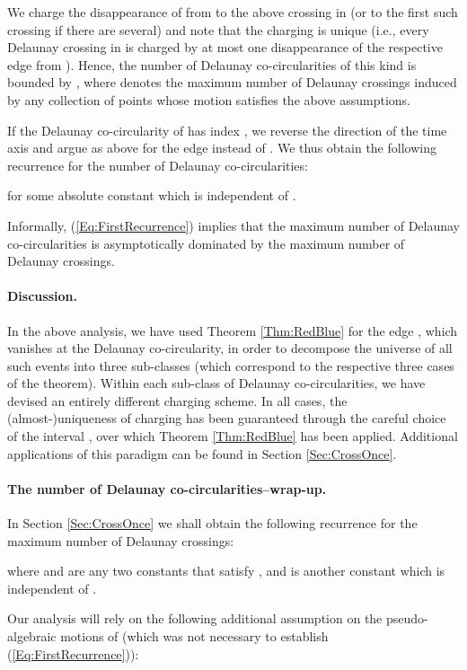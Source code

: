 \documentclass[letter,11pt]{article}
\begin{document}
We charge the disappearance of  from  to the above crossing in  (or to the first such crossing if there are several) and note that the charging is unique (i.e., every Delaunay crossing  in  is charged by at most one disappearance of the respective edge  from ).
Hence, the number of Delaunay co-circularities of this kind is bounded by , where  denotes the maximum number of Delaunay crossings induced by any collection  of  points whose motion satisfies the above assumptions.


If the Delaunay co-circularity of  has index , we reverse the direction of the time axis and argue as above for the edge  instead of . We thus obtain the following recurrence for the number of Delaunay co-circularities:


for some absolute constant  which is independent of .

Informally, (\ref{Eq:FirstRecurrence}) implies that the maximum number of Delaunay co-circularities is asymptotically dominated by the maximum number of Delaunay crossings.

\paragraph{Discussion.} In the above analysis, we have used Theorem \ref{Thm:RedBlue} for the edge , which vanishes at the Delaunay co-circularity, in order to decompose the universe of all such events into three sub-classes (which correspond to the respective three cases of the theorem). Within each sub-class of Delaunay co-circularities, we have devised an entirely different charging scheme. In all cases, the (almost-)uniqueness of charging has been guaranteed through the careful choice of the interval , over which Theorem \ref{Thm:RedBlue} has been applied. Additional applications of this paradigm can be found in Section \ref{Sec:CrossOnce}.


\paragraph{The number of Delaunay co-circularities--wrap-up.}
In Section \ref{Sec:CrossOnce} we shall obtain the following recurrence for the maximum number  of Delaunay crossings:



where  and  are any two constants that satisfy , and
 is another constant which is independent of .

Our analysis will rely on the following additional assumption on the pseudo-algebraic motions of  (which was not necessary to establish (\ref{Eq:FirstRecurrence})):
\end{document}
